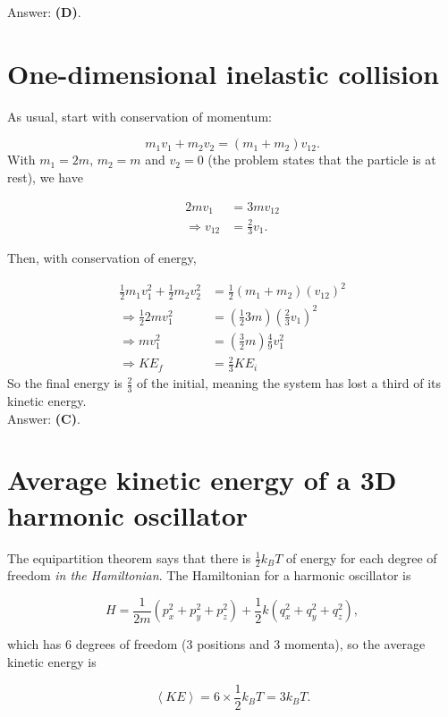 \documentclass[11pt]{paper}
\newcommand{\answer}[1]{Answer: \textbf{(#1)}.}
\begin{document}
\answer{D}

\section{One-dimensional inelastic collision}
As usual, start with conservation of momentum:

\begin{equation}
m_1 v_1 + m_2 v_2 = (m_1 + m_2) v_{12}.
\end{equation}
With $m_1 = 2m$, $m_2 = m$ and $v_2 = 0$ (the problem states that the particle is at rest), we have

\begin{align}
2m v_1 &= 3m v_{12}\\
\Rightarrow v_{12} &= \frac{2}{3} v_1.
\end{align}

Then, with conservation of energy,

\begin{align}
\frac{1}{2} m_1 v_1^2 + \frac{1}{2} m_2 v_2^2 &= \frac{1}{2} \left(m_1 + m_2\right) (v_{12})^2\\
\Rightarrow \frac{1}{2} 2 m v_1^2  &= \left(\frac{1}{2} 3 m\right) \left(\frac{2}{3} v_1\right)^2\\
\Rightarrow m v_1^2 &= \left(\frac{3}{2}m\right) \frac{4}{9} v_1^2\\
\Rightarrow KE_f &= \frac{2}{3} KE_i
\end{align}
So the final energy is $\frac{2}{3}$ of the initial, meaning the system has lost a third of its kinetic energy.\\

\answer{C}

\section{Average kinetic energy of a 3D harmonic oscillator}
The equipartition theorem says that there is $\frac{1}{2}k_B T$ of energy for each degree of freedom \emph{in the Hamiltonian}.  The Hamiltonian for a harmonic oscillator is 

\begin{equation}
H = \frac{1}{2m} \left( p_x^2 + p_y^2 + p_z^2 \right) + \frac{1}{2} k \left( q_x^2 + q_y^2 + q_z^2 \right),
\end{equation}

which has 6 degrees of freedom (3 positions and 3 momenta), so the average kinetic energy is 

\begin{equation}
\left< KE \right>  = 6 \times \frac{1}{2} k_B T = 3 k_B T.
\end{equation}
\end{document}
